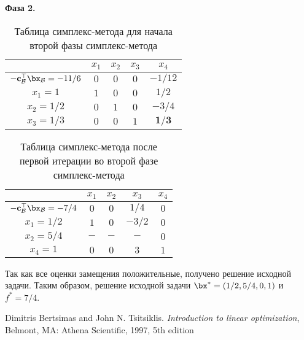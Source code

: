 \documentclass[12pt]{article}
\begin{document}
\textbf{Фаза 2.}

\begin{table}[!ht]
\centering
\caption{Таблица симплекс-метода для начала второй фазы симплекс-метода}
\begin{tabular}{|c|cccc|}
\hline
& $x_1$ & $x_2$ & $x_3$ & $x_4$\\
\hline
$-\mathbf{c}_{\mathcal{B}}^{\top}\bx_{\mathcal{B}} = -11/6$ & $0$ & $0$ & $0$ & $-1/12$ \\
\hline
$x_1 = 1$ & $1$ & $0$ & $0$ & $1/2$ \\
$x_2 = 1/2$ & $0$ & $1$ & $0$ & $-3/4$ \\
$x_3 = 1/3$ & $0$ & $0$ & $1$ & $\mathbf{1/3}$\\
\hline
\end{tabular}
\label{tab::simplex_3_phase2_0}
\end{table}

\begin{table}[!ht]
\centering
\caption{Таблица симплекс-метода после первой итерации во второй фазе симплекс-метода}
\begin{tabular}{|c|cccc|}
\hline
& $x_1$ & $x_2$ & $x_3$ & $x_4$\\
\hline
$-\mathbf{c}_{\mathcal{B}}^{\top}\bx_{\mathcal{B}} = -7/4$ & $0$ & $0$ & $1/4$ & $0$ \\
\hline
$x_1 = 1/2$ & $1$ & $0$ & $-3/2$ & $0$ \\
$x_2 = 5/4$ & $-$ & $-$ & $-$ & $0$ \\
$x_4 = 1$ & $0$ & $0$ & $3$ & $1$\\
\hline
\end{tabular}
\label{tab::simplex_3_phase2_1}
\end{table}

Так как все оценки замещения положительные, получено решение исходной задачи.
Таким образом, решение исходной задачи $\bx^* = (1/2, 5/4, 0, 1)$ и $f^* = 7/4$.


\begin{thebibliography}{9}

Dimitris Bertsimas and John N. Tsitsiklis. \emph{Introduction to linear optimization}, Belmont, MA: Athena Scientific, 1997, 5th edition

\end{thebibliography}
\end{document}
